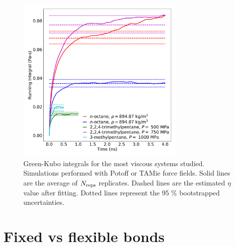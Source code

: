 \documentclass[preprint,review,12pt]{elsarticle}
\begin{document}
    \begin{figure}[htb!]
    	\centering
    	\includegraphics[width=3.2in]{most_viscous_systems.pdf}
    	\caption{Green-Kubo integrals for the most viscous systems studied. Simulations performed with Potoff or TAMie force fields. Solid lines are the average of $N_{\rm reps}$ replicates. Dashed lines are the estimated $\eta$ value after fitting. Dotted lines represent the 95 \% bootstrapped uncertainties.}
    	\label{fig:most_viscous}
    \end{figure} 
    
    
%    
%    
	

	\newpage
	
	\section{Fixed vs flexible bonds} \label{fixed flexible}
	
\end{document}
